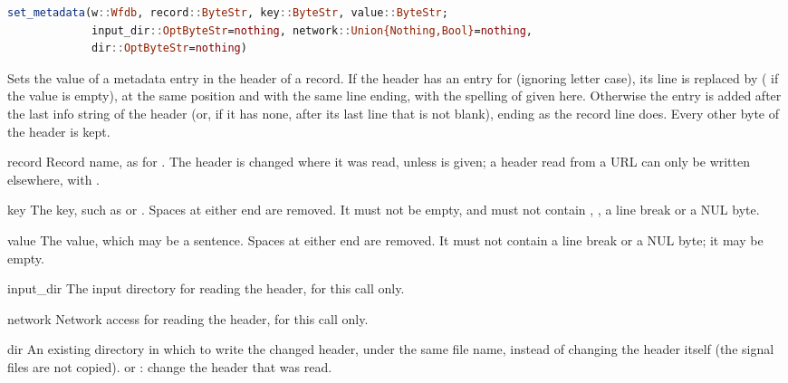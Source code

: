 \begin{lstlisting}[language=Julia,style=signature]
set_metadata(w::Wfdb, record::ByteStr, key::ByteStr, value::ByteStr;
             input_dir::OptByteStr=nothing, network::Union{Nothing,Bool}=nothing,
             dir::OptByteStr=nothing)
\end{lstlisting}
Sets the value of a metadata entry in the header of a record. If the header has an entry
for  (ignoring letter case), its line is replaced by 
( if the value is empty), at the same position and with the same line
ending, with the spelling of  given here. Otherwise the entry is added after the
last info string of the header (or, if it has none, after its last line that is not
blank), ending as the record line does. Every other byte of the header is kept.
\begin{params}
\item[record] Record name, as for . The header is changed where it
  was read, unless  is given; a header read from a URL can only be written
  elsewhere, with .
\item[key] The key, such as  or . Spaces at either end
  are removed. It must not be empty, and must not contain \code{:}, \code{\#}, a line
  break or a NUL byte.
\item[value] The value, which may be a sentence. Spaces at either end are removed. It must
  not contain a line break or a NUL byte; it may be empty.
\item[input\_dir] The input directory for reading the header, for this call only.
\item[network] Network access for reading the header, for this call only.
\item[dir] An existing directory in which to write the changed header, under the same file
  name, instead of changing the header itself (the signal files are not copied).
   or : change the header that was read.
\end{params}
